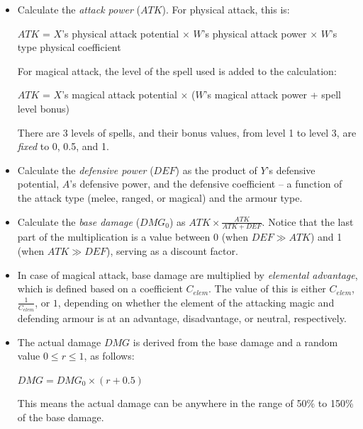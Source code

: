 \begin{itemize}
	\item Calculate the \textit{attack power} ($ATK$). For physical attack, this is:
	
	\begin{center}
		$ATK$ = $X$'s physical attack potential $\times$ $W$'s physical attack power $\times$ $W$'s type physical coefficient
	\end{center}
	
	For magical attack, the level of the spell used is added to the calculation:
	
	\begin{center}
		$ATK$ = $X$'s magical attack potential $\times$ ($W$'s magical attack power + spell level bonus)
	\end{center}
	
	There are 3 levels of spells, and their bonus values, from level 1 to level 3, are \textit{fixed} to 0, 0.5, and 1. 
	
	\item Calculate the \textit{defensive power} ($DEF$) as the product of $Y$'s defensive potential, $A$'s defensive power, and the defensive coefficient -- a function of the attack type (melee, ranged, or magical) and the armour type.
	
	\item Calculate the \textit{base damage} ($DMG_0$) as $ATK \times \frac{ATK}{ATK+DEF}$. Notice that the last part of the multiplication is a value between 0 (when $DEF \gg ATK$) and 1 (when $ATK \gg DEF$), serving as a discount factor.
	
	\item In case of magical attack, base damage are multiplied by \textit{elemental advantage}, which is defined based on a coefficient $C_{elem}$. The value of this is either $C_{elem}$, $\frac{1}{C_{elem}}$, or $1$, depending on whether the element of the attacking magic and defending armour is at an advantage, disadvantage, or neutral, respectively.
	
	\item The actual damage $DMG$ is derived from the base damage and a random value $0 \leq r \leq 1$, as follows:
	\begin{center}
		$DMG = DMG_0 \times (r + 0.5)$
	\end{center}
	
	This means the actual damage can be anywhere in the range of 50\% to 150\% of the base damage.
\end{itemize}

